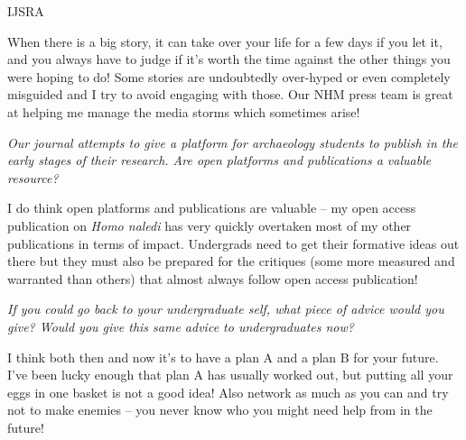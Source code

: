 \documentclass{ijsra}
\begin{document}
\begin{labeling}{IJSRA}
\item[CS]
When there is a big story, it can take over your life for a few days if you let it,
and you always have to judge if it’s worth the time against the other things you were hoping to do!
Some stories are undoubtedly over-hyped or even completely misguided and I try to avoid engaging with those.
Our NHM press team is great at helping me manage the media storms which sometimes arise!

\item[IJSRA]
\emph{Our journal attempts to give a platform for archaeology students to publish in the early stages of their research.
Are open platforms and publications a valuable resource?}

\item[CS]
I do think open platforms and publications are valuable – my open access publication on \emph{Homo naledi} has
very quickly overtaken most of my other publications in terms of impact.
Undergrads need to get their formative ideas out there but they must also be prepared for the critiques
(some more measured and warranted than others) that almost always follow open access publication!

\item[IJSRA]
\emph{If you could go back to your undergraduate self, what piece of advice would you give?
Would you give this same advice to undergraduates now?}

\item[CS]
I think both then and now it’s to have a plan A and a plan B for your future.
I’ve been lucky enough that plan A has usually worked out, but putting all your eggs in one basket is not a good idea!
Also network as much as you can and try not to make enemies – you never know who you might need help from in the future!

\end{labeling}
\IJSRAclosing
\end{document}
